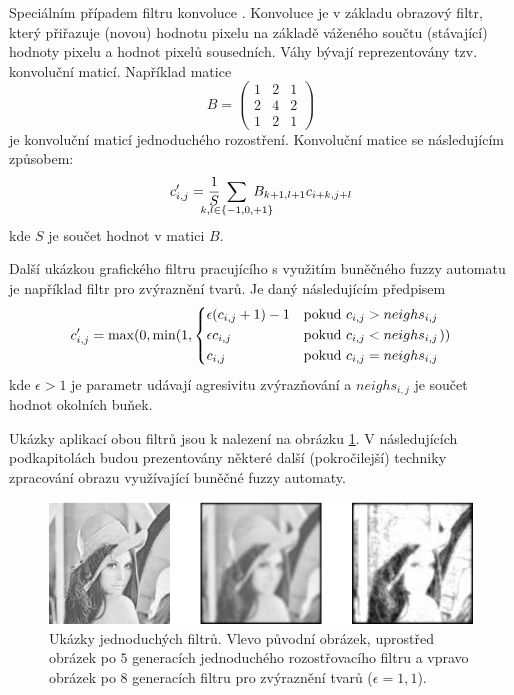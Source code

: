 \documentclass[a4paper,10pt]{article}
\begin{document}
Speciálním případem filtru konvoluce \cite{Rus-ImaProHan}. Konvoluce je v základu obrazový filtr, který přiřazuje (novou) hodnotu pixelu na základě váženého součtu (stávající) hodnoty pixelu a hodnot pixelů sousedních. Váhy bývají reprezentovány tzv. konvoluční maticí. Například matice
$$
  B = \begin{pmatrix}
       1 & 2 & 1 \\
       2 & 4 & 2 \\
       1 & 2 & 1 
      \end{pmatrix}
$$
je konvoluční maticí jednoduchého rozostření. Konvoluční matice se následujícím způsobem:
$$
  c'_{i,j} = \frac{1}{S} \; \sum_{\mathclap{k,l \in \{-1, 0, +1\}}} \; B_{k+1, l+1} c_{i+k, j+l}
$$
kde $S$ je součet hodnot v matici $B$.

Další ukázkou grafického filtru pracujícího s využitím buněčného fuzzy automatu je například filtr pro zvýraznění tvarů. Je daný následujícím předpisem
$$
  c'_{i,j} = \max(0, \min(1, 
    \begin{dcases}
      \epsilon (c_{i,j} + 1) - 1	& \text{pokud $c_{i,j} > neighs_{i,j}$} \\
      \epsilon c_{i,j}			& \text{pokud $c_{i,j} < neighs_{i,j}$} \\
      c_{i,j}	& \text{pokud $c_{i,j} = neighs_{i,j}$} 
    \end{dcases}
    ))
$$
kde $\epsilon > 1$ je parametr udávají agresivitu zvýrazňování a $neighs_{i,j}$ je součet hodnot okolních buňek.

Ukázky aplikací obou filtrů jsou k nalezení na obrázku \ref{img:Filters}. V následujících podkapitolách budou prezentovány některé další (pokročilejší) techniky zpracování obrazu využívající buněčné fuzzy automaty.

\begin{figure}
 \includegraphics[width=\textwidth]{filters}
 
 \caption{Ukázky jednoduchých filtrů. Vlevo původní obrázek, uprostřed obrázek po $5$ generacích jednoduchého rozostřovacího filtru a vpravo obrázek po $8$ generacích filtru pro zvýraznění tvarů ($\epsilon = 1{,}1$).} \label{img:Filters}
\end{figure}
\end{document}
